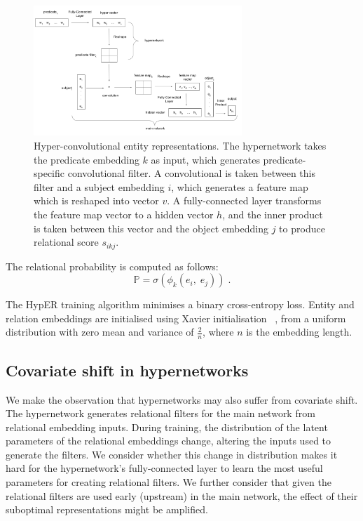 \begin{figure}
   	\centering
    	\includegraphics[width=0.7\textwidth, height=0.5\textwidth]{hyper_neural_tensor_network_final}
	\caption{Hyper-convolutional entity representations. The hypernetwork takes the predicate embedding $ k $ as input, which generates predicate-specific convolutional filter. A convolutional is taken between this filter and a subject embedding $ i $, which generates a feature map which is reshaped into vector $ v $. A fully-connected layer transforms the feature map vector to a hidden vector $ h $, and the inner product is taken between this vector and the object embedding $ j $ to produce relational score $ s_{ikj} $.}
\end{figure}

\noindent The relational probability is computed as follows: 
\begin{equation}
	\mathbb{P} = \sigma(\phi_k(e_i, \; e_j)) \; .
\end{equation}

\noindent The HypER training algorithm minimises a binary cross-entropy loss. Entity and relation embeddings are initialised using Xavier initialisation \unskip ~\citep{glorot2010understanding}, from a uniform distribution with zero mean and variance of $ \frac{2}{n} $, where $ n $ is the embedding length. \par

\subsection{Covariate shift in hypernetworks}

We make the observation that hypernetworks may also suffer from covariate shift. The hypernetwork generates relational filters for the main network from relational embedding inputs. During training, the distribution of the latent parameters of the relational embeddings change, altering the inputs used to generate the filters. We consider whether this change in distribution makes it hard for the hypernetwork's fully-connected layer to learn the most useful parameters for creating relational filters. We further consider that given the relational filters are used early (upstream) in the main network, the effect of their suboptimal representations might be amplified. \par

